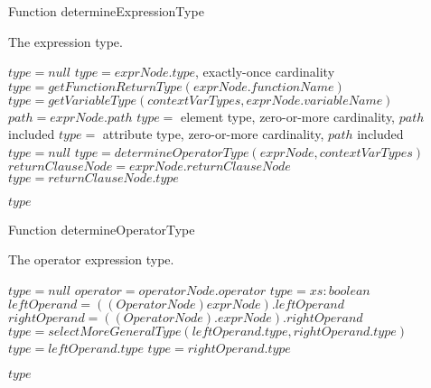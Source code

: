 \begin{algorithm}
\caption{Function determineExpressionType}
\label{ALG_func_determineExpressionType}
\begin{algorithmic}[1]
\ENSURE The expression type.

\STATE $type = null$
     \STATE $type = exprNode.type$, exactly-once cardinality
     \STATE $type = getFunctionReturnType(exprNode.functionName)$
     \STATE $type = getVariableType(contextVarTypes, exprNode.variableName)$
     \STATE $path = exprNode.path$
         \STATE $type =$ element type, zero-or-more cardinality, $path$ included
         \STATE $type =$ attribute type, zero-or-more cardinality, $path$ included
     \ELSE
         \STATE $type = null$
     \ENDIF
{}
     \STATE $type = determineOperatorType(exprNode, contextVarTypes)$
     \STATE $returnClauseNode = exprNode.returnClauseNode$
     \STATE $type = returnClauseNode.type$
\ENDIF

\RETURN $type$
\end{algorithmic}
\end{algorithm}


\begin{algorithm}
\caption{Function determineOperatorType}
\label{ALG_func_determineOperatorType}
\begin{algorithmic}[1]
\ENSURE The operator expression type.

\STATE $type = null$
\STATE $operator = operatorNode.operator$
    \STATE $type = xs:boolean$
    \STATE $leftOperand = ((OperatorNode)exprNode).leftOperand$
    \STATE $rightOperand = ((OperatorNode).exprNode).rightOperand$
        \STATE $type = selectMoreGeneralType(leftOperand.type, rightOperand.type)$
        \STATE $type = leftOperand.type$
        \STATE $type = rightOperand.type$
    \ENDIF
\ENDIF

\RETURN $type$
\end{algorithmic}
\end{algorithm}

